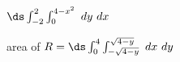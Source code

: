 {$\ds \int_{-2}^2\int_0^{4-x^2} \ dy \ dx$
}
{\noindent \begin{minipage}{\linewidth}
\end{minipage}

area of $R = \ds\int_{0}^{4}\int_{-\sqrt{4-y}}^{\sqrt{4-y}}\ dx\ dy$
}
